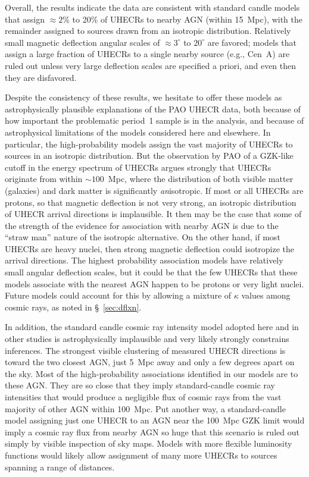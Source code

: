 Overall, the results indicate the data are consistent with standard
candle models that assign $\approx 2$\% to 20\% of UHECRs to nearby AGN
(within 15~Mpc), with the remainder assigned to sources drawn from an
isotropic distribution.
Relatively small magnetic deflection angular scales of $\approx 3^\circ$
to $20^\circ$ are favored; models that assign a large fraction of UHECRs
to a single nearby source (e.g., Cen~A) are ruled out unless very large
deflection scales are specified a priori, and even then they are disfavored.

Despite the consistency of these results, we hesitate to offer these models
as astrophysically plausible explanations of the PAO UHECR data, both
because of how important the problematic period~1 sample is in the analysis,
and because of astrophysical limitations of the models considered here and
elsewhere.  In particular, the high-probability models assign the
vast majority of UHECRs to sources in an isotropic distribution. But the
observation by PAO of a GZK-like cutoff in the energy spectrum of UHECRs
argues strongly that UHECRs originate from within $\sim 100$~Mpc, where the
distribution of both visible matter (galaxies) and dark matter is
significantly {\em an}isotropic.  If most or all UHECRs are protons, so that
magnetic deflection is not very strong, an isotropic distribution of
UHECR arrival directions is implausible. It then may be the case that some
of the strength of the evidence for association with nearby AGN is due to
the ``straw man'' nature of the isotropic alternative.  On the other hand, if
most UHECRs are heavy nuclei, then strong magnetic deflection could
isotropize the arrival directions. The highest probability association
models have relatively small angular deflection scales, but it could be that
the few UHECRs that these models associate with the nearest AGN happen to be
protons or very light nuclei.  Future models could account for this
by allowing a mixture of $\kappa$ values among cosmic rays, as noted
in \S~\ref{sec:dflxn}.

In addition, the standard candle cosmic ray intensity model adopted here and
in other studies is astrophysically implausible and very likely strongly
constrains inferences.  The strongest visible clustering of measured UHECR
directions is toward the two closest AGN, just 5~Mpc away and only a few
degrees apart on the sky.  Most of the high-probability associations
identified in our models are to these AGN.  They are so close that they
imply standard-candle cosmic ray intensities that would produce a negligible
flux of cosmic rays from the vast majority of other AGN within 100~Mpc.  Put
another way, a standard-candle model assigning just one UHECR to an AGN near
the 100~Mpc GZK limit would imply a cosmic ray flux from nearby AGN so huge
that this scenario is ruled out simply by visible inspection of sky maps. 
Models with more flexible luminosity functions would likely allow assignment
of many more UHECRs to sources spanning a range of distances.

